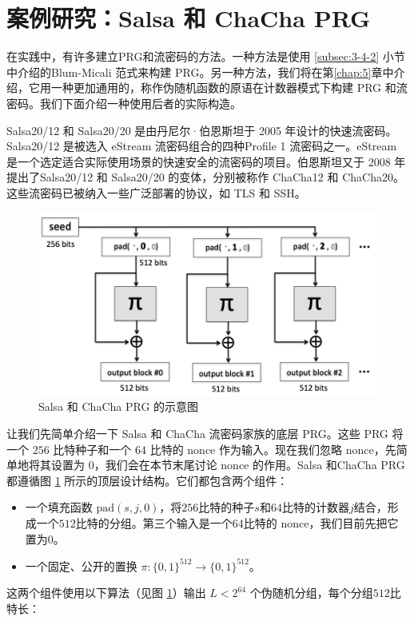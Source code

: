 \section{案例研究：Salsa 和 ChaCha PRG}\label{sec:3-6}

在实践中，有许多建立PRG和流密码的方法。一种方法是使用 \ref{subsec:3-4-2} 小节中介绍的Blum-Micali 范式来构建 PRG。另一种方法，我们将在第\ref{chap:5}章中介绍，它用一种更加通用的，称作伪随机函数的原语在计数器模式下构建 PRG 和流密码。我们下面介绍一种使用后者的实际构造。

Salsa20/12 和 Salsa20/20 是由丹尼尔·伯恩斯坦于 2005 年设计的快速流密码。Salsa20/12 是被选入 eStream 流密码组合的四种Profile 1 流密码之一。eStream 是一个选定适合实际使用场景的快速安全的流密码的项目。伯恩斯坦又于 2008 年提出了Salsa20/12 和 Salsa20/20 的变体，分别被称作 ChaCha12 和 ChaCha20。这些流密码已被纳入一些广泛部署的协议，如 TLS 和 SSH。

\begin{figure}
  \centering
  \includegraphics[width=0.7\linewidth]{figures/chapter3/fig8.png}
  \caption{Salsa 和 ChaCha PRG 的示意图}
  \label{fig:3-8}
\end{figure}

让我们先简单介绍一下 Salsa 和 ChaCha 流密码家族的底层 PRG。这些 PRG 将一个 $256$ 比特种子和一个 $64$ 比特的 nonce 作为输入。现在我们忽略 nonce，先简单地将其设置为 $0$，我们会在本节末尾讨论 nonce 的作用。Salsa 和ChaCha PRG 都遵循图 \ref{fig:3-8} 所示的顶层设计结构。它们都包含两个组件：
\begin{itemize}
	\item 一个填充函数 $\mathrm{pad}(s,j,0)$，将$256$比特的种子$s$和$64$比特的计数器$j$结合，形成一个$512$比特的分组。第三个输入是一个$64$比特的 nonce，我们目前先把它置为$0$。
	\item 一个固定、公开的置换 $\pi:\{0,1\}^{512}\to\{0,1\}^{512}$。
\end{itemize}
这两个组件使用以下算法（见图 \ref{fig:3-8}）输出 $L<2^{64}$ 个伪随机分组，每个分组$512$比特长：

\vspace*{5pt}

